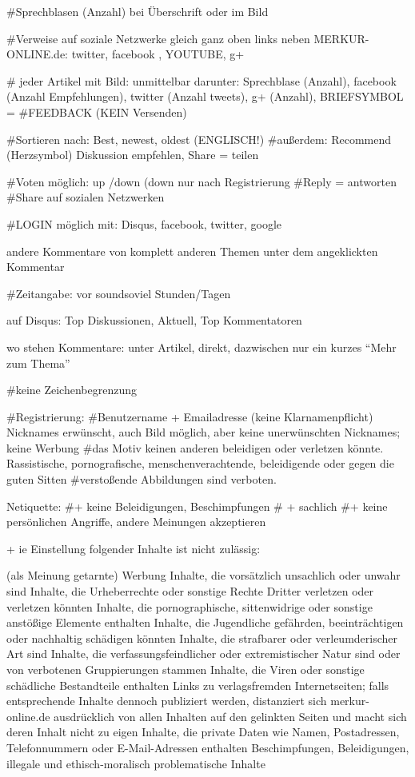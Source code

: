 #Sprechblasen (Anzahl) bei Überschrift oder im Bild

#Verweise auf soziale Netzwerke  gleich ganz oben links neben MERKUR-ONLINE.de: twitter, facebook , YOUTUBE, g+

# jeder Artikel mit Bild: unmittelbar darunter: Sprechblase (Anzahl), facebook (Anzahl Empfehlungen), twitter (Anzahl tweets), g+ (Anzahl), BRIEFSYMBOL =  #FEEDBACK (KEIN Versenden)

#Sortieren nach: Best, newest, oldest (ENGLISCH!)
#außerdem: Recommend (Herzsymbol) Diskussion empfehlen, Share = teilen 

#Voten möglich: up /down (down nur nach Registrierung
#Reply = antworten
#Share auf sozialen Netzwerken

#LOGIN möglich mit: Disqus, facebook, twitter, google

andere Kommentare von komplett anderen Themen unter dem angeklickten Kommentar

#Zeitangabe: vor soundsoviel Stunden/Tagen

auf Disqus: Top Diskussionen, Aktuell, Top Kommentatoren

wo stehen Kommentare: unter Artikel, direkt, dazwischen nur ein kurzes ``Mehr zum Thema''

#keine Zeichenbegrenzung



#Registrierung:
#Benutzername + Emailadresse (keine Klarnamenpflicht) Nicknames erwünscht, auch Bild möglich, aber keine unerwünschten Nicknames; keine Werbung
#das Motiv keinen anderen beleidigen oder verletzen könnte. Rassistische, pornografische, menschenverachtende, beleidigende oder gegen die guten Sitten #verstoßende Abbildungen sind verboten.



Netiquette:
#+ keine Beleidigungen, Beschimpfungen
# + sachlich
#+ keine persönlichen Angriffe, andere Meinungen akzeptieren 

+ ie Einstellung folgender Inhalte ist nicht zulässig:

    (als Meinung getarnte) Werbung
    Inhalte, die vorsätzlich unsachlich oder unwahr sind
    Inhalte, die Urheberrechte oder sonstige Rechte Dritter verletzen oder verletzen könnten
    Inhalte, die pornographische, sittenwidrige oder sonstige anstößige Elemente enthalten Inhalte, die Jugendliche gefährden, beeinträchtigen oder nachhaltig schädigen könnten
    Inhalte, die strafbarer oder verleumderischer Art sind
    Inhalte, die verfassungsfeindlicher oder extremistischer Natur sind oder von verbotenen Gruppierungen stammen
    Inhalte, die Viren oder sonstige schädliche Bestandteile enthalten
    Links zu verlagsfremden Internetseiten; falls entsprechende Inhalte dennoch publiziert werden, distanziert sich merkur-online.de ausdrücklich von allen Inhalten auf den gelinkten Seiten und macht sich deren Inhalt nicht zu eigen
    Inhalte, die private Daten wie Namen, Postadressen, Telefonnummern oder E-Mail-Adressen enthalten
    Beschimpfungen, Beleidigungen, illegale und ethisch-moralisch problematische Inhalte
    

